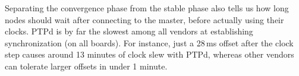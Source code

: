 
Separating the convergence phase from the stable phase also tells us how long
nodes should wait after connecting to the master,
before actually using their clocks.
PTPd is by far the slowest among all vendors at establishing synchronization
(on all boards).
For instance, just a 28\,ms offset after the clock step causes around 13 minutes
of clock slew with PTPd, whereas other vendors can tolerate larger offsets
in under 1 minute.


